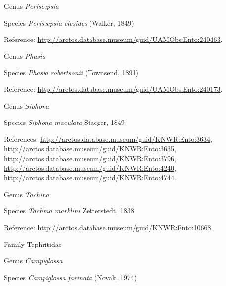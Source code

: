 \documentclass[9pt, article]{memoir}
\begin{document}
\begin{multicols}{2}
\vspace{6pt}\noindent\hspace{30pt}Genus \textit{Periscepsia}


\vspace{6pt}\noindent\hspace{36pt}Species \textit{Periscepsia clesides} (Walker, 1849)


Reference: 
\url{http://arctos.database.museum/guid/UAMObs:Ento:240463}.

\vspace{6pt}\noindent\hspace{30pt}Genus \textit{Phasia}


\vspace{6pt}\noindent\hspace{36pt}Species \textit{Phasia robertsonii} (Townsend, 1891)


Reference: 
\url{http://arctos.database.museum/guid/UAMObs:Ento:240173}.

\vspace{6pt}\noindent\hspace{30pt}Genus \textit{Siphona}


\vspace{6pt}\noindent\hspace{36pt}Species \textit{Siphona maculata} Staeger, 1849


References: 
\url{http://arctos.database.museum/guid/KNWR:Ento:3634}, 
\url{http://arctos.database.museum/guid/KNWR:Ento:3635}, 
\url{http://arctos.database.museum/guid/KNWR:Ento:3796}, 
\url{http://arctos.database.museum/guid/KNWR:Ento:4240}, 
\url{http://arctos.database.museum/guid/KNWR:Ento:4744}.

\vspace{6pt}\noindent\hspace{30pt}Genus \textit{Tachina}


\vspace{6pt}\noindent\hspace{36pt}Species \textit{Tachina marklini} Zetterstedt, 1838


Reference: 
\url{http://arctos.database.museum/guid/KNWR:Ento:10668}.

\vspace{6pt}\noindent\hspace{24pt}Family Tephritidae


\vspace{6pt}\noindent\hspace{30pt}Genus \textit{Campiglossa}


\vspace{6pt}\noindent\hspace{36pt}Species \textit{Campiglossa farinata} (Novak, 1974)



\end{multicols}
\end{document}
